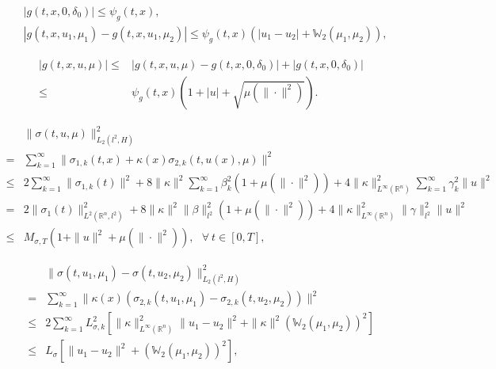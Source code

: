 \documentclass[10pt,a4paper]{amsart}
\def\leq{\leqslant}
\begin{document}
 \begin{align}
   & |g(t,x,0, \delta_0)| \leq \psi_g(t,x),   \label{g-1}  \\
   & |g(t,x, u_1, \mu_1) - g(t,x, u_1, \mu_2)|
     \leq \psi_g(t,x)
          \left( | u_1 - u_2 | + \mathbb{W}_2(\mu_1, \mu_2)
          \right),   \label{g-2}
\end{align}

\begin{align} \label{g-3}
     |g(t,x, u, \mu)|
     \leq & |g(t,x, u, \mu) - g(t,x,0, \delta_0)|
             + |g(t,x,0, \delta_0)|
                \nonumber \\
     \leq & \psi_g(t,x)
                      \left (
                             1 + |u| + \sqrt{ \mu( \|\cdot\|^2) }
                      \right ).
\end{align}

\begin{align} \label{sigma3}
        & \|\sigma(t,u,\mu)\|_{L_2(l^2, H)}^2  \nonumber \\
      = & \sum_{k=1}^\infty \| \sigma_{1,k}(t,x) + \kappa(x) \sigma_{2,k} (t, u(x), \mu ) \|^2
           \nonumber \\
   \leq & 2 \sum_{k=1}^\infty \| \sigma_{1,k}(t) \|^2
          + 8 \| \kappa \|^2 \sum_{k=1}^\infty \beta_{k}^2 \left( 1 + \mu( \|\cdot\|^2) \right)
          + 4 \| \kappa \|_{L^\infty(\mathbb{R}^n)}^2 \sum_{k=1}^\infty \gamma_{k}^2 \| u \|^2  \nonumber\\
      = & 2 \| \sigma_{1}(t) \|_{L^2(\mathbb{R}^n, l^2)}^2
          + 8 \| \kappa \|^2 \| \beta \|_{l^2}^2 \left( 1 + \mu( \|\cdot\|^2) \right)
          + 4 \| \kappa \|_{L^\infty(\mathbb{R}^n)}^2 \| \gamma\|_{l^2}^2 \| u \|^2
             \nonumber \\
   \leq & M_{\sigma,T} \left( 1 + \| u \|^2 + \mu( \|\cdot\|^2) \right),
          \ \ \ \forall \ t \in [0,T],
\end{align}

\begin{align} \label{sigmalip}
     & \| \sigma (t, u_1, \mu_1) -\sigma (t, u_2, \mu_2)\|^2 _{L_2(l^2, H)}
          \nonumber \\
   = & \sum_{k=1}^\infty
            \| \kappa(x)
                      \left( \sigma_{2,k} (t, u_1, \mu_1)
                              - \sigma_{2,k} (t, u_2, \mu_2)
                      \right)
            \|^2  \nonumber \\
  \leq &
       2  \sum_{k=1}^\infty
        L_{\sigma,k}^2
                    \left[ \| \kappa \|_{L^\infty(\mathbb{R}^n)}^2
                    \| u_1 - u_2 \|^2
                           +
                           \| \kappa\|^2 \left( \mathbb{W}_2 (\mu_1, \mu_2)
                             \right)^2
                    \right]
                           \nonumber \\
  \leq & L_{\sigma} \left[ \| u_1 - u_2 \|^2
                           + \left( \mathbb{W}_2 (\mu_1, \mu_2)
                             \right)^2
                    \right],
\end{align}
\end{document}

